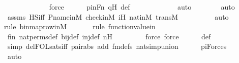 \begin{isabellebody}
\ \ \ \ \ \ \ \ \ \ \ \isamarkupfalse%
\ force\isanewline
\ \ \ \ \isamarkupfalse%
\ pinFn\ qH\ {\isasymphi}{\isacharunderscore}{\kern0pt}def\ \isanewline
\ \ \ \ \ \ \ \ \ \ \isamarkupfalse%
\ auto{\isacharbrackleft}{\kern0pt}{}{\isacharbrackright}{\kern0pt}\isanewline
\ \ \ \ \ \ \isamarkupfalse%
\ auto{\isacharbrackleft}{\kern0pt}{}{\isacharbrackright}{\kern0pt}\isanewline
\ \ \ \ \isamarkupfalse%
\ assms\ HS{\isacharunderscore}{\kern0pt}iff\ P{\isacharunderscore}{\kern0pt}name{\isacharunderscore}{\kern0pt}in{\isacharunderscore}{\kern0pt}M\ check{\isacharunderscore}{\kern0pt}in{\isacharunderscore}{\kern0pt}M\ iH\ nat{\isacharunderscore}{\kern0pt}in{\isacharunderscore}{\kern0pt}M\ transM\isanewline
\ \ \ \ \ \ \ \ \isamarkupfalse%
\ auto{\isacharbrackleft}{\kern0pt}{}{\isacharbrackright}{\kern0pt}\isanewline
\ \ \ \ \ \ \isamarkupfalse%
{\isacharparenleft}{\kern0pt}rule\ binmap{\isacharunderscore}{\kern0pt}row{\isacharprime}{\kern0pt}{\isacharunderscore}{\kern0pt}in{\isacharunderscore}{\kern0pt}M{\isacharparenright}{\kern0pt}\isanewline
\ \ \ \ \ \ \isamarkupfalse%
{\isacharparenleft}{\kern0pt}rule\ function{\isacharunderscore}{\kern0pt}value{\isacharunderscore}{\kern0pt}in{\isacharparenright}{\kern0pt}\isanewline
\ \ \ \ \isamarkupfalse%
\ fin\ nat{\isacharunderscore}{\kern0pt}perms{\isacharunderscore}{\kern0pt}def\ bij{\isacharunderscore}{\kern0pt}def\ inj{\isacharunderscore}{\kern0pt}def\ nH\isanewline
\ \ \ \ \ \ \ \isamarkupfalse%
\ {\isacharparenleft}{\kern0pt}force{\isacharcomma}{\kern0pt}\ force{\isacharparenright}{\kern0pt}\isanewline
\ \ \ \ \isamarkupfalse%
\ {\isasymphi}{\isacharunderscore}{\kern0pt}def\isanewline
\ \ \ \ \ \isamarkupfalse%
\ {\isacharparenleft}{\kern0pt}simp\ del{\isacharcolon}{\kern0pt}FOL{\isacharunderscore}{\kern0pt}sats{\isacharunderscore}{\kern0pt}iff\ pair{\isacharunderscore}{\kern0pt}abs\ add{\isacharcolon}{\kern0pt}\ fm{\isacharunderscore}{\kern0pt}defs\ nat{\isacharunderscore}{\kern0pt}simp{\isacharunderscore}{\kern0pt}union{\isacharparenright}{\kern0pt}\isanewline
\ \ \ \ \isamarkupfalse%
\ piForces\isanewline
\ \ \ \ \isamarkupfalse%
\ auto\isanewline
\ \ \isamarkupfalse%
\ \isamarkupfalse%

\end{isabellebody}
